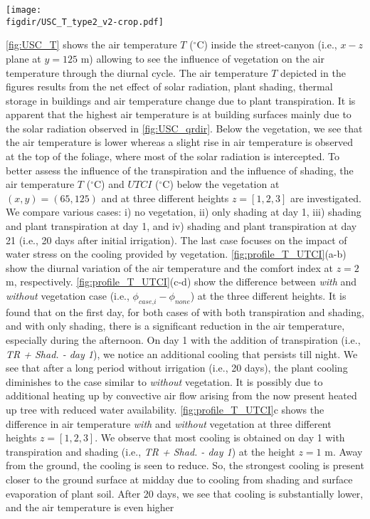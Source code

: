 \begin{sidewaysfigure}[p]
	\centering
	\texttt{[image: \\figdir/USC\_T\_type2\_v2-crop.pdf]}
	\caption{Air temperature $T$ ($^{\circ}$C) inside the street-canyon where the vegetation zone is indicated by a green box. The plot shows the fields with a 150 minutes interval from 03:00 to 23:00 (HH:MM).}
	\label{fig:USC_T}
\end{sidewaysfigure}

\cref{fig:USC_T} shows the air temperature $T$ ($^{\circ}$C) inside the street-canyon (i.e., $x-z$ plane at $y=125$ m) allowing to see the influence of vegetation on the air temperature through the diurnal cycle. The air temperature $T$ depicted in the figures results from the net effect of solar radiation, plant shading, thermal storage in buildings and air temperature change due to plant transpiration. It is apparent that the highest air temperature is at building surfaces mainly due to the solar radiation observed in \cref{fig:USC_qrdir}. Below the vegetation, we see that the air temperature is lower whereas a slight rise in air temperature is observed at the top of the foliage, where most of the solar radiation is intercepted. To better assess the influence of the transpiration and the influence of shading, the air temperature $T$ ($^{\circ}$C) and $UTCI$  ($^{\circ}$C) below the vegetation at $(x,y) = (65, 125)$ and at three different heights $z = [1,2,3]$ are investigated. We compare various cases: i) no vegetation, ii) only shading at day 1, iii) shading and plant transpiration at day 1, and iv) shading and plant transpiration at day 21 (i.e., 20 days after initial irrigation). The last case focuses on the impact of water stress on the cooling provided by vegetation. \cref{fig:profile_T_UTCI}(a-b) show the diurnal variation of the air temperature and the comfort index at $z=2$ m, respectively. \cref{fig:profile_T_UTCI}(c-d) show the difference between \textit{with} and \textit{without} vegetation case (i.e., $\phi_{\textit{case,i}} - \phi_{\textit{none}}$) at the three different heights. It is found that on the first day, for both cases of with both transpiration and shading, and with only shading, there is a significant reduction in the air temperature, especially during the afternoon. On day 1 with the addition of transpiration (i.e., \textit{TR + Shad. - day 1}), we notice an additional cooling that persists till night. We see that after a long period without irrigation (i.e., 20 days), the plant cooling diminishes to the case similar to \textit{without} vegetation. It is possibly due to additional heating up by convective air flow arising from the now present heated up tree with reduced water availability. \cref{fig:profile_T_UTCI}c shows the difference in air temperature \textit{with} and \textit{without} vegetation at three different heights $z=[1,2,3]$. We observe that most cooling is obtained on day 1 with transpiration and shading (i.e., \textit{TR + Shad. - day 1}) at the height $z=1$ m. Away from the ground, the cooling is seen to reduce. So, the strongest cooling is present closer to the ground surface at midday due to cooling from shading and surface evaporation of plant soil. After 20 days, we see that cooling is substantially lower, and the air temperature is even higher 